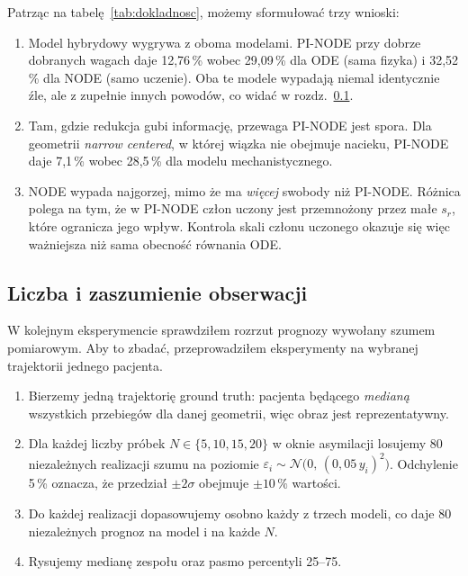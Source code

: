 \documentclass[11pt,a4paper]{article}
\begin{document}
Patrząc na tabelę~\ref{tab:dokladnosc}, możemy sformułować trzy wnioski:

\begin{enumerate}
\item Model hybrydowy wygrywa z oboma modelami. PI-NODE
przy dobrze dobranych wagach daje 12,76\,\% wobec 29,09\,\% dla ODE (sama fizyka) i
32,52\,\% dla NODE (samo uczenie). Oba te modele wypadają niemal identycznie
źle, ale z zupełnie innych powodów, co widać w rozdz.~\ref{sec:pasma}.

\item Tam, gdzie redukcja gubi informację, przewaga PI-NODE jest spora.
Dla geometrii \emph{narrow centered}, w której wiązka nie obejmuje nacieku,
PI-NODE daje 7,1\,\% wobec 28,5\,\% dla modelu mechanistycznego.

\item NODE wypada najgorzej, mimo że ma \emph{więcej} swobody niż PI-NODE. Różnica
polega na tym, że w PI-NODE człon uczony jest przemnożony przez małe $s_r$, które
ogranicza jego wpływ. Kontrola skali członu uczonego okazuje się więc ważniejsza niż
sama obecność równania ODE.
\end{enumerate}

\subsection{Liczba i zaszumienie obserwacji}
\label{sec:pasma}

W kolejnym eksperymencie sprawdziłem rozrzut prognozy wywołany szumem
pomiarowym. Aby to zbadać, przeprowadziłem eksperymenty na wybranej trajektorii jednego pacjenta.

\begin{enumerate}
\item Bierzemy jedną trajektorię ground truth: pacjenta będącego \emph{medianą} wszystkich przebiegów dla
danej geometrii, więc obraz jest reprezentatywny.
\item Dla każdej liczby próbek $N \in \{5, 10, 15, 20\}$ w oknie asymilacji losujemy
80 niezależnych realizacji szumu na poziomie
$\varepsilon_i \sim \mathcal{N}\!\big(0,\,(0{,}05\,y_i)^2\big)$. Odchylenie 5\,\% oznacza,
że przedział $\pm 2\sigma$ obejmuje $\pm 10\,\%$ wartości.
\item Do każdej realizacji dopasowujemy osobno każdy z trzech modeli, co daje 80
niezależnych prognoz na model i na każde $N$.
\item Rysujemy medianę zespołu oraz pasmo percentyli 25--75.
\end{enumerate}
\end{document}
